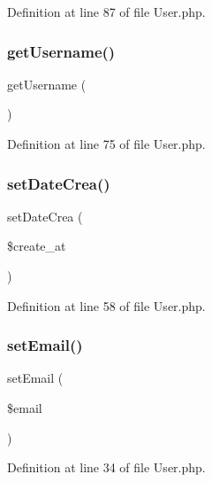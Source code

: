 Definition at line 87 of file User.\+php.

\mbox{\label{class_src_1_1_entity_1_1_user_a81b37a3c9d639574e394f80c1138c75e}} 
\subsubsection{get\+Username()}
{\footnotesize\ttfamily get\+Username (\begin{DoxyParamCaption}{ }\end{DoxyParamCaption})}



Definition at line 75 of file User.\+php.

\mbox{\label{class_src_1_1_entity_1_1_user_a9c8311c6d2e7d1d118a6a6da7b577c0b}} 
\subsubsection{set\+Date\+Crea()}
{\footnotesize\ttfamily set\+Date\+Crea (\begin{DoxyParamCaption}\item[{Date\+Time}]{\$create\+\_\+at }\end{DoxyParamCaption})}



Definition at line 58 of file User.\+php.

\mbox{\label{class_src_1_1_entity_1_1_user_a5ef76eef42d2624386442eeb636d338c}} 
\subsubsection{set\+Email()}
{\footnotesize\ttfamily set\+Email (\begin{DoxyParamCaption}\item[{}]{\$email }\end{DoxyParamCaption})}



Definition at line 34 of file User.\+php.

\mbox{\label{class_src_1_1_entity_1_1_user_a9f9f5983de6ae197176a80f55f113a6c}} 
